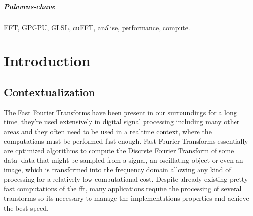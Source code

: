 \documentclass[
  oneside,
  11pt, a4paper,
  footinclude=true,
  headinclude=true,
  cleardoublepage=empty
]{scrbook}
\begin{document}
\paragraph{Palavras-chave} FFT, GPGPU, GLSL, cuFFT, análise, performance, compute.


    \cleardoublepage
    
    \setcounter{page}{3}
    
    \cleardoublepage
    \tableofcontents
    
    \cleardoublepage
    \listoffigures
    
    \cleardoublepage
    \listoftables
            
    \cleardoublepage
    \lstlistoflistings

    \printglossary[type=\acronymtype]
    
    \cleardoublepage
    \setcounter{page}{5}


\chapter{Introduction} \label{chap:introduction}

\section{Contextualization} \label{sec:contextualization}

The Fast Fourier Transforms have been present in our surroundings for a long time, they're used extensively in digital signal processing including many other areas and they often need to be used in a realtime context, where the computations must be performed fast enough. Fast Fourier Transforms essentially are optimized algorithms to compute the Discrete Fourier Transform of some data, data that might be sampled from a signal, an oscillating object or even an image, which is transformed into the frequency domain allowing any kind of processing for a relatively low computational cost. Despite already existing pretty fast computations of the \acrshort{fft}, many applications require the processing of several transforms so its necessary to manage the implementations properties and achieve the best speed.
\end{document}

